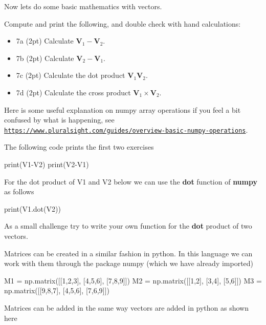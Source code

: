 \documentclass[%
oneside,                 %
final,                   %
10pt]{article}
\begin{document}
Now lets do some basic mathematics with vectors.

Compute and print the following, and double check with hand calculations:

\begin{itemize}
\item 7a (2pt)  Calculate $\bm{V}_1-\bm{V}_2$.

\item 7b (2pt)  Calculate $\bm{V}_2-\bm{V}_1$.

\item 7c (2pt) Calculate the dot product $\bm{V}_1\bm{V}_2$.

\item 7d (2pt) Calculate the cross product $\bm{V}_1\times\bm{V}_2$.
\end{itemize}

\noindent
Here is some useful explanation on numpy array operations if you feel a bit confused by what is happening,
see \href{{https://www.pluralsight.com/guides/overview-basic-numpy-operations}}{\nolinkurl{https://www.pluralsight.com/guides/overview-basic-numpy-operations}}.

The following code prints the first two exercises



\bpycod
print(V1-V2)
print(V2-V1)

\epycod


For the dot product of V1 and V2 below we can use the \textbf{dot} function of \textbf{numpy} as follows


\bpycod
print(V1.dot(V2))

\epycod

As a small challenge try to write your own function for the \textbf{dot} product of two vectors.

Matrices can be created in a similar fashion in python.  In this
language we can work with them through the package numpy (which we
have already imported)











\bpycod
M1 = np.matrix([[1,2,3],
             [4,5,6],
             [7,8,9]])
M2 = np.matrix([[1,2],
             [3,4],
             [5,6]])
M3 = np.matrix([[9,8,7],
             [4,5,6],
             [7,6,9]])

\epycod


Matrices can be added in the same way vectors are added in python as shown here
\end{document}

